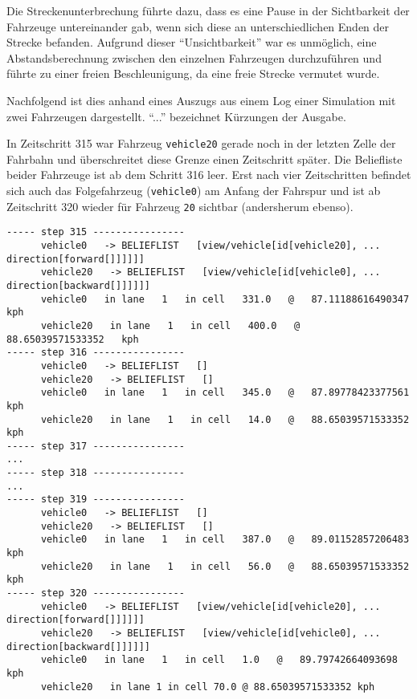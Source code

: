 Die Streckenunterbrechung führte dazu, dass es eine Pause in der Sichtbarkeit der Fahrzeuge untereinander gab, wenn sich diese an unterschiedlichen Enden der Strecke befanden.
Aufgrund dieser \enquote{Unsichtbarkeit} war es unmöglich, eine Abstandsberechnung zwischen den einzelnen Fahrzeugen durchzuführen und führte zu einer freien Beschleunigung, da eine freie Strecke vermutet wurde.

Nachfolgend ist dies anhand eines Auszugs aus einem Log einer Simulation mit zwei Fahrzeugen dargestellt.
\enquote{...} bezeichnet Kürzungen der Ausgabe.

In Zeitschritt 315 war Fahrzeug \texttt{vehicle20} gerade noch in der letzten Zelle der Fahrbahn und überschreitet diese Grenze einen Zeitschritt später.
Die Beliefliste beider Fahrzeuge ist ab dem Schritt 316 leer.
Erst nach vier Zeitschritten befindet sich auch das Folgefahrzeug (\texttt{vehicle0}) am Anfang der Fahrspur und ist ab Zeitschritt 320 wieder für Fahrzeug \texttt{20} sichtbar (andersherum ebenso).

\footnotesize\begin{verbatim}
----- step 315 ----------------
      vehicle0   -> BELIEFLIST   [view/vehicle[id[vehicle20], ... direction[forward[]]]]]]
      vehicle20   -> BELIEFLIST   [view/vehicle[id[vehicle0], ... direction[backward[]]]]]]
      vehicle0   in lane   1   in cell   331.0   @   87.11188616490347   kph
      vehicle20   in lane   1   in cell   400.0   @   88.65039571533352   kph
----- step 316 ----------------
      vehicle0   -> BELIEFLIST   []
      vehicle20   -> BELIEFLIST   []
      vehicle0   in lane   1   in cell   345.0   @   87.89778423377561   kph
      vehicle20   in lane   1   in cell   14.0   @   88.65039571533352   kph
----- step 317 ----------------
...
----- step 318 ----------------
...
----- step 319 ----------------
      vehicle0   -> BELIEFLIST   []
      vehicle20   -> BELIEFLIST   []
      vehicle0   in lane   1   in cell   387.0   @   89.01152857206483   kph
      vehicle20   in lane   1   in cell   56.0   @   88.65039571533352   kph
----- step 320 ----------------
      vehicle0   -> BELIEFLIST   [view/vehicle[id[vehicle20], ... direction[forward[]]]]]]
      vehicle20   -> BELIEFLIST   [view/vehicle[id[vehicle0], ... direction[backward[]]]]]]
      vehicle0   in lane   1   in cell   1.0   @   89.79742664093698   kph
      vehicle20   in lane 1 in cell 70.0 @ 88.65039571533352 kph
\end{verbatim}
\normalsize

